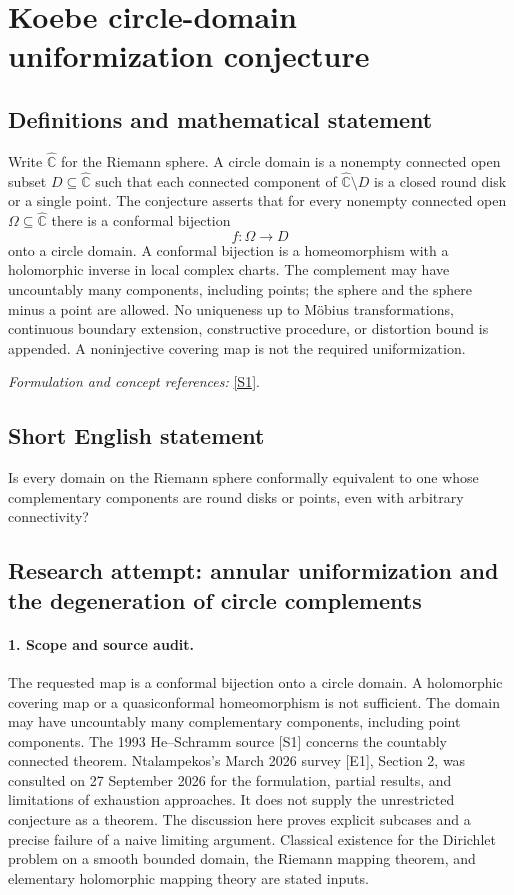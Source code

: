 \documentclass[11pt]{article}
\begin{document}
\section*{\texorpdfstring{Koebe circle-domain uniformization conjecture}{Koebe circle-domain uniformization conjecture}}\label{30006872}
\subsection{Definitions and mathematical statement}
Write $\widehat{{\mathbb{C}}}$ for the Riemann sphere. A circle domain is a nonempty connected open subset $D\subseteq\widehat{{\mathbb{C}}}$ such that each connected component of $\widehat{{\mathbb{C}}}\setminus D$ is a closed round disk or a single point. The conjecture asserts that for every nonempty connected open $\Omega\subseteq\widehat{{\mathbb{C}}}$ there is a conformal bijection
\[
 f:\Omega\longrightarrow D
\]
onto a circle domain. A conformal bijection is a homeomorphism with a holomorphic inverse in local complex charts. The complement may have uncountably many components, including points; the sphere and the sphere minus a point are allowed. No uniqueness up to M\"obius transformations, continuous boundary extension, constructive procedure, or distortion bound is appended. A noninjective covering map is not the required uniformization.
\par\smallskip\textit{Formulation and concept references:} \href{https://www.math.stonybrook.edu/~bishop/classes/math536.S24/He_Schramm_1993.pdf}{[S1]}.

\subsection{Short English statement}
Is every domain on the Riemann sphere conformally equivalent to one whose complementary components are round disks or points, even with arbitrary connectivity?
\subsection{Research attempt: annular uniformization and the degeneration of circle complements}
\paragraph{1. Scope and source audit.}
The requested map is a conformal bijection onto a circle domain. A holomorphic covering map or a quasiconformal homeomorphism is not sufficient. The domain may have uncountably many complementary components, including point components. The 1993 He--Schramm source [S1] concerns the countably connected theorem. Ntalampekos's March 2026 survey [E1], Section 2, was consulted on 27 September 2026 for the formulation, partial results, and limitations of exhaustion approaches. It does not supply the unrestricted conjecture as a theorem. The discussion here proves explicit subcases and a precise failure of a naive limiting argument. Classical existence for the Dirichlet problem on a smooth bounded domain, the Riemann mapping theorem, and elementary holomorphic mapping theory are stated inputs.
\end{document}
